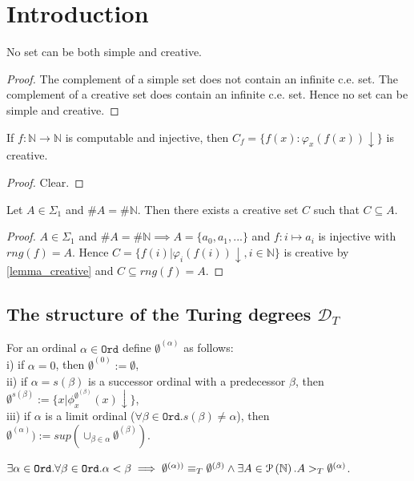 \chapter{Introduction}

\begin{proposition}
No set can be both simple and creative.
\end{proposition}

\begin{proof}
The complement of a simple set does not contain an infinite c.e. set. The complement of a creative set does contain an infinite c.e. set. Hence no set can be simple and creative.
\end{proof}

\begin{lemma}\label{lemma_creative}
If $f : \mathbb{N} \to \mathbb{N}$ is computable and injective, then $C_f = \{f(x) : \varphi_x(f(x))\downarrow \}$ is creative.
\end{lemma}
\begin{proof}
Clear.
\end{proof}

\begin{proposition}
Let $A \in \Sigma_1$ and $\#A = \#\mathbb{N}$. Then there exists a creative set $C$ such that $C \subseteq A$.
\end{proposition}

\begin{proof}
$A \in \Sigma_1$ and $\#A = \#\mathbb{N} \implies A=\{a_0, a_1, ... \}$ and $f:i \mapsto a_i$ is injective with $rng(f)=A$. 
Hence $C=\{f(i) | \varphi_i(f(i))\downarrow, i \in \mathbb{N}\}$ is creative by \autoref{lemma_creative} and $C \subseteq	 rng(f) = A$.
\end{proof}

\section{The structure of the Turing degrees $\mathcal{D}_T$}

\begin{defn}For an ordinal $\alpha \in \mathtt{Ord}$ define $\emptyset^{(\alpha)}$ as follows:\\
i) if $\alpha=0$, then $\emptyset^{(0)}:=\emptyset$,\\
ii) if $\alpha=s(\beta)$ is a successor ordinal with a predecessor $\beta$, then $\emptyset^{s(\beta)}:=\{x | \phi^{\emptyset^{(\beta)}}_x(x) \downarrow \}$,\\
iii) if $\alpha$ is a limit ordinal ($\forall \beta \in \mathtt{Ord}. s(\beta) \not = \alpha$), then $\emptyset^{(\alpha)}):=sup(\cup_{\beta \in \alpha} \emptyset^{(\beta)})$.
\end{defn}

\begin{proposition}
$\exists \alpha \in \mathtt{Ord}. \forall \beta \in \mathtt{Ord}. \alpha < \beta \implies \emptyset^{(\alpha))} \equiv_T \emptyset^{(\beta)} \land \exists A \in \mathcal{P} \left({ \mathbb{N} }\right). A >_T \emptyset^{(\alpha)}$.
\end{proposition}